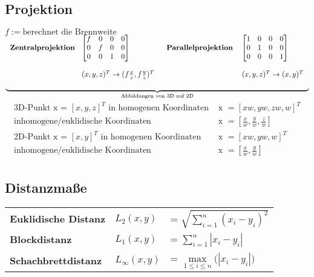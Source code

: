 \documentclass[8pt]{article}
\begin{document}
			\subsection{Projektion}
				$f := \text{berechnet die Brennweite}$\\
				$\underbrace{\begin{tabular}{p{3cm} p{3.5cm} p{3.3cm} p{3cm}}
					\textbf{Zentralprojektion } & $
						\begin{bmatrix}
							f & 0 & 0 & 0 \\
							0 & f & 0 & 0 \\
							0 & 0 & 1 & 0 \\
						\end{bmatrix}$ & 
					\textbf{ Parallelprojektion } & {$
						\begin{bmatrix}
							1 & 0 & 0 & 0 \\
							0 & 1 & 0 & 0 \\
							0 & 0 & 0 & 1 \\
						\end{bmatrix}
					$}\\\\
					& $(x, y, z)^T \rightarrow (f \frac{x}{z}, f \frac{y}{z})^T$ & & $(x, y, z)^T \rightarrow (x, y)^T$\\\\
				\end{tabular}}_{\text{Abbildungen von 3D auf 2D}}$\\
				\begin{align*}
					\text{3D-Punkt x = } [x, y, z]^T \text{ in homogenen Koordinaten } & \text{x } = [xw, yw, zw, w]^T\\
					\text{inhomogene/euklidische Koordinaten } & \text{x } = [\frac{x}{w}, \frac{y}{w}, \frac{z}{w}]\\
					\text{2D-Punkt x = } [x, y]^T \text{ in homogenen Koordinaten } & \text{x } = [xw, yw, w]^T\\
					\text{inhomogene/euklidische Koordinaten } & \text{x } = [\frac{x}{w}, \frac{y}{w}]\\
				\end{align*}
			\subsection{Distanzma\ss e}
				\begin{tabular}{p{3.5cm} p{1.5cm} p{3cm}}
					\textbf{Euklidische Distanz } 	& $L_2(x, y)$ 		& = $\sqrt{\sum\limits_{i = 1}^{n} (x_i - y_i)^2}$\\
					\textbf{Blockdistanz } 			& $L_1(x, y)$ 		& = $\sum\limits_{i = 1}^{n} |x_i - y_i|$ \\
					\textbf{Schachbrettdistanz } 	& $L_\infty(x, y)$ 	& = $\max\limits^{}_{1 \leq i \leq n} \big( |x_i - y_i|\big)$ \\
				\end{tabular}
\end{document}
